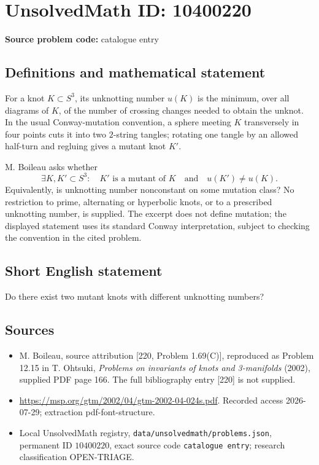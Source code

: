 \documentclass[11pt]{article}
\begin{document}
\section*{UnsolvedMath ID: 10400220}
\textbf{Source problem code:} catalogue entry
\subsection{Definitions and mathematical statement}
For a knot \(K\subset S^3\), its unknotting number \(u(K)\) is the minimum, over all diagrams of \(K\), of the number of crossing changes needed to obtain the unknot. In the usual Conway-mutation convention, a sphere meeting \(K\) transversely in four points cuts it into two \(2\)-string tangles; rotating one tangle by an allowed half-turn and regluing gives a mutant knot \(K'\).

M. Boileau asks whether
\[
 \exists K,K'\subset S^3:\quad
 K'\text{ is a mutant of }K\quad\text{and}\quad u(K')\ne u(K).
\]
Equivalently, is unknotting number nonconstant on some mutation class? No restriction to prime, alternating or hyperbolic knots, or to a prescribed unknotting number, is supplied. The excerpt does not define mutation; the displayed statement uses its standard Conway interpretation, subject to checking the convention in the cited problem.
\subsection{Short English statement}
Do there exist two mutant knots with different unknotting numbers?
\subsection{Sources}
\begin{itemize}
\item M. Boileau, source attribution [220, Problem 1.69(C)], reproduced as Problem 12.15 in T. Ohtsuki, \emph{Problems on invariants of knots and 3-manifolds} (2002), supplied PDF page 166. The full bibliography entry [220] is not supplied.
\item \url{https://msp.org/gtm/2002/04/gtm-2002-04-024s.pdf}. Recorded access 2026-07-29; extraction pdf-font-structure.
\item Local UnsolvedMath registry, \texttt{data/unsolvedmath/problems.json}, permanent ID \(10400220\), exact source code \texttt{catalogue entry}; research classification OPEN-TRIAGE.
\end{itemize}
\end{document}
